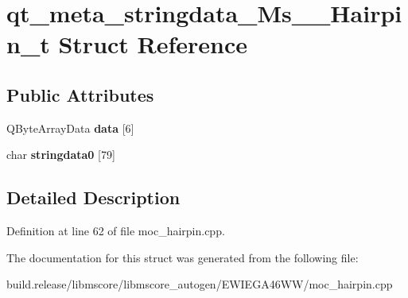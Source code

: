 \hypertarget{structqt__meta__stringdata___ms_____hairpin__t}{}\section{qt\+\_\+meta\+\_\+stringdata\+\_\+\+Ms\+\_\+\+\_\+\+Hairpin\+\_\+t Struct Reference}
\label{structqt__meta__stringdata___ms_____hairpin__t}
\subsection*{Public Attributes}
\begin{DoxyCompactItemize}
\item 
\mbox{\label{structqt__meta__stringdata___ms_____hairpin__t_ac4fa3820fda5828ca55143bbcc771d6c}} 
Q\+Byte\+Array\+Data {\bfseries data} \mbox{[}6\mbox{]}
\item 
\mbox{\label{structqt__meta__stringdata___ms_____hairpin__t_ab54fda362f2d9dd789fb0b26575e2f38}} 
char {\bfseries stringdata0} \mbox{[}79\mbox{]}
\end{DoxyCompactItemize}


\subsection{Detailed Description}


Definition at line 62 of file moc\+\_\+hairpin.\+cpp.



The documentation for this struct was generated from the following file\+:\begin{DoxyCompactItemize}
\item 
build.\+release/libmscore/libmscore\+\_\+autogen/\+E\+W\+I\+E\+G\+A46\+W\+W/moc\+\_\+hairpin.\+cpp\end{DoxyCompactItemize}
